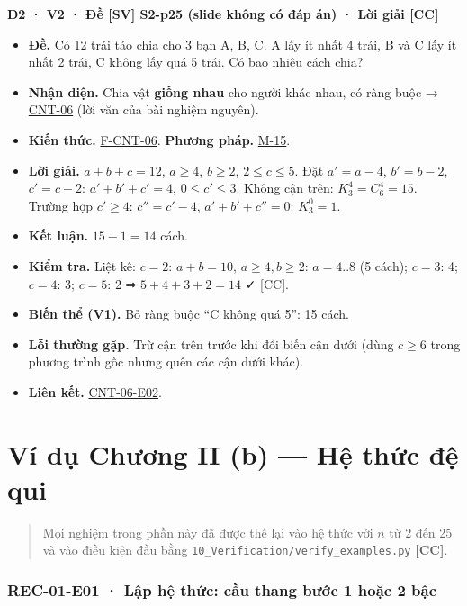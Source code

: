 \documentclass[
  10pt,
  twoside,openany]{book}
\providecommand{\tightlist}{%
  \setlength{\itemsep}{0pt}\setlength{\parskip}{0pt}}
\begin{document}
\textbf{D2 · V2 · Đề {[}SV{]} S2-p25 (slide không có đáp án) · Lời giải
{[}CC{]}}

\begin{itemize}
\tightlist
\item
  \textbf{Đề.} Có 12 trái táo chia cho 3 bạn A, B, C. A lấy ít nhất 4
  trái, B và C lấy ít nhất 2 trái, C không lấy quá 5 trái. Có bao nhiêu
  cách chia?
\item
  \textbf{Nhận diện.} Chia vật \textbf{giống nhau} cho người khác nhau,
  có ràng buộc → \protect\hyperlink{CNT-06}{CNT-06} (lời văn của bài
  nghiệm nguyên).
\item
  \textbf{Kiến thức.} \protect\hyperlink{F-CNT-06}{F-CNT-06}.
  \textbf{Phương pháp.} \protect\hyperlink{M-15}{M-15}.
\item
  \textbf{Lời giải.} \(a+b+c=12\), \(a\ge4\), \(b\ge2\), \(2\le c\le5\).
  Đặt \(a'=a-4\), \(b'=b-2\), \(c'=c-2\): \(a'+b'+c'=4\),
  \(0\le c'\le3\). Không cận trên: \(K_3^4=C_6^4=15\). Trường hợp
  \(c'\ge4\): \(c''=c'-4\), \(a'+b'+c''=0\): \(K_3^0=1\).
\item
  \textbf{Kết luận.} \(15-1=14\) cách.
\item
  \textbf{Kiểm tra.} Liệt kê: \(c=2\): \(a+b=10\), \(a\ge4,b\ge2\):
  \(a=4..8\) (5 cách); \(c=3\): 4; \(c=4\): 3; \(c=5\): 2 ⇒
  \(5+4+3+2=14\) ✓ {[}CC{]}.
\item
  \textbf{Biến thể (V1).} Bỏ ràng buộc ``C không quá 5'': 15 cách.
\item
  \textbf{Lỗi thường gặp.} Trừ cận trên trước khi đổi biến cận dưới
  (dùng \(c\ge6\) trong phương trình gốc nhưng quên các cận dưới khác).
\item
  \textbf{Liên kết.} \protect\hyperlink{CNT-06-E02}{CNT-06-E02}.
\end{itemize}

\hypertarget{ex-ch2b}{%
\chapter{Ví dụ Chương II (b) --- Hệ thức đệ qui}\label{ex-ch2b}}

\begin{quote}
Mọi nghiệm trong phần này đã được thế lại vào hệ thức với \(n\) từ 2 đến
25 và vào điều kiện đầu bằng
\texttt{10\_Verification/verify\_examples.py} \textbf{{[}CC{]}}.
\end{quote}

\hypertarget{REC-01-E01}{%
\subsection{REC-01-E01 · Lập hệ thức: cầu thang bước 1 hoặc 2
bậc}\label{REC-01-E01}}
\end{document}
